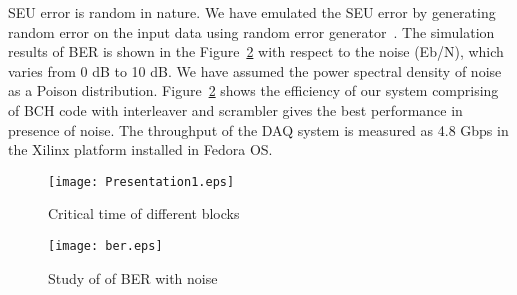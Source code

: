 \documentclass[10pt, conference, compsocconf]{IEEEtran}
\begin{document}
\par SEU error is random in nature. We have emulated the SEU error by generating random error on the input data using random error generator~\cite{Antoni:IEEETran:2003}. The simulation results of BER is shown in the Figure~\ref{Rxmarginanalysis} with respect to the noise (Eb/N), which varies from 0 dB to 10 dB. We have assumed the power spectral density of noise as a Poison distribution. Figure~\ref{Rxmarginanalysis} shows the efficiency of our system comprising of BCH code with interleaver and scrambler gives the best performance in presence of noise. The throughput of the DAQ system is measured as 4.8 Gbps in the Xilinx platform installed in Fedora OS.
\begin{table}[htb]
\centering
\caption{Module wise power consumption}
\label{table:powerconsumtion}
\vspace{-20 pt}
\end{table}   
\begin{figure}[htb]
\centering
\texttt{[image: Presentation1.eps]}
\vspace{-45 pt}
\caption{Critical time of different blocks }
\label{fig:CiticalPathDelay}
\vspace{-15 pt}

\end{figure}
\begin{figure}[t!]
\centering
\texttt{[image: ber.eps]}
\vspace{-10 pt}
\caption{Study of of BER with noise}
\vspace{-18 pt}
\label{Rxmarginanalysis}
\end{figure}
\end{document}
